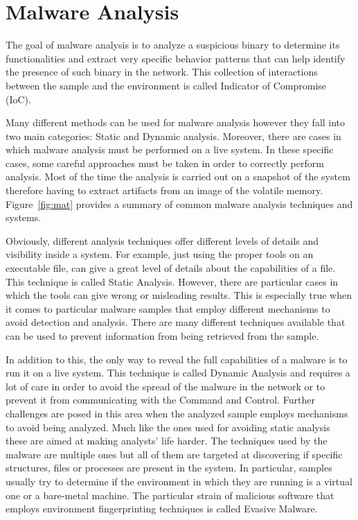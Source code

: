 
\chapter{Malware Analysis}
\label{chap:2}

The goal of malware analysis is to analyze a suspicious binary to determine its functionalities and extract very specific behavior patterns that can help identify the presence of such binary in the network. This collection of interactions between the sample and the environment is called Indicator of Compromise (IoC).

Many different methods can be used for malware analysis however they fall into two main categories: Static and Dynamic analysis. Moreover, there are cases in which malware analysis must be performed on a live system. In these specific cases, some careful approaches must be taken in order to correctly perform analysis. Most of the time the analysis is carried out on a snapshot of the system therefore having to extract artifacts from an image of the volatile memory. Figure~\ref{fig:mat} provides a summary of common malware analysis techniques and systems.%

Obviously, different analysis techniques offer different levels of details and visibility inside a system. For example, just using the proper tools on an executable file, can give a great level of details about the capabilities of a file. This technique is called Static Analysis. However, there are particular cases in which the tools can give wrong or misleading results. This is especially true when it comes to particular malware samples that employ different mechanisms to avoid detection and analysis. There are many different techniques available that can be used to prevent information from being retrieved from the sample.  

In addition to this, the only way to reveal the full capabilities of a malware is to run it on a live system. This technique is called Dynamic Analysis and requires a lot of care in order to avoid the spread of the malware in the network or to prevent it from communicating with the Command and Control. Further challenges are posed in this area when the analyzed sample employs mechanisms to avoid being analyzed. Much like the ones used for avoiding static analysis these are aimed at making analysts' life harder. The techniques used by the malware are multiple ones but all of them are targeted at discovering if specific structures, files or processes are present in the system. In particular, samples usually try to determine if the environment in which they are running is a virtual one or a bare-metal machine. The particular strain of malicious software that employs environment fingerprinting techniques is called Evasive Malware. 

